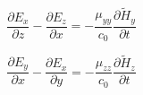 \documentclass[a4paper,10pt]{article}
\begin{document}
\begin{equation}
  \frac{\partial E_x}{\partial z} - \frac{\partial E_z}{\partial x} = -\frac{\mu_{yy}}{c_0}\frac{\partial\tilde{H}_y}{\partial t}
\end{equation}

\begin{equation}
  \frac{\partial E_y}{\partial x} - \frac{\partial E_x}{\partial y} = -\frac{\mu_{zz}}{c_0}\frac{\partial\tilde{H}_z}{\partial t}
\end{equation}
\end{document}
